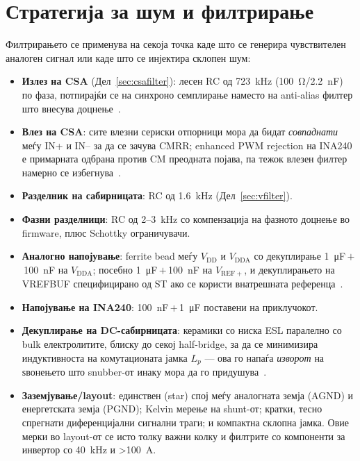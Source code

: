 \documentclass[journal,onecolumn,11pt]{IEEEtran}
\begin{document}
\section{Стратегија за шум и филтрирање}\label{sec:noise}
Филтрирањето се применува на секоја точка каде што се генерира чувствителен аналоген сигнал или каде
што се инјектира склопен шум:
\begin{itemize}[leftmargin=1.3em]
\item \textbf{Излез на CSA} (Дел~\ref{sec:csafilter}): лесен RC од \SI{723}{\kilo\hertz}
      (\SI{100}{\ohm}/\SI{2.2}{\nano\farad}) по фаза, потпирајќи се на синхроно семплирање наместо на
      anti-alias филтер што внесува доцнење~\cite{an5346}.
\item \textbf{Влез на CSA}: сите влезни сериски отпорници мора да бидат \emph{совпаднати} меѓу IN+ и
      IN-- за да се зачува CMRR; enhanced PWM rejection на INA240 е примарната одбрана против CM
      преодната појава, па тежок влезен филтер намерно се избегнува~\cite{ina240ds}.
\item \textbf{Разделник на сабирницата}: RC од \SI{1.6}{\kilo\hertz} (Дел~\ref{sec:vfilter}).
\item \textbf{Фазни разделници}: RC од 2--\SI{3}{\kilo\hertz} со компензација на фазното доцнење во
      firmware, плюс Schottky ограничувачи.
\item \textbf{Аналогно напојување}: ferrite bead меѓу \(V_{\mathrm{DD}}\) и \(V_{\mathrm{DDA}}\) со
      декуплирање \SI{1}{\micro\farad}\,$+$\,\SI{100}{\nano\farad} на \(V_{\mathrm{DDA}}\); посебно
      \SI{1}{\micro\farad}\,$+$\,\SI{100}{\nano\farad} на \(V_{\mathrm{REF+}}\), и декуплирањето на
      VREFBUF специфицирано од ST ако се користи внатрешната референца~\cite{stm32g473ds}.
\item \textbf{Напојување на INA240}: \SI{100}{\nano\farad}\,$+$\,\SI{1}{\micro\farad} поставени на
      приклучокот.
\item \textbf{Декуплирање на DC-сабирницата}: керамики со ниска ESL паралелно со bulk електролитите,
      блиску до секој half-bridge, за да се минимизира индуктивноста на комутационата јамка \(L_p\) ---
      ова го напаѓа \emph{изворот} на ѕвонењето што snubber-от инаку мора да го придушува~\cite{severns}.
\item \textbf{Заземјување/layout}: единствен (star) спој меѓу аналогната земја (AGND) и енергетската
      земја (PGND); Kelvin мерење на shunt-от; кратки, тесно спрегнати диференцијални сигнални траги; и
      компактна склопна јамка. Овие мерки во layout-от се исто толку важни колку и филтрите со
      компоненти за инвертор со \SI{40}{\kilo\hertz} и \SI{>100}{\ampere}.
\end{itemize}
\end{document}
